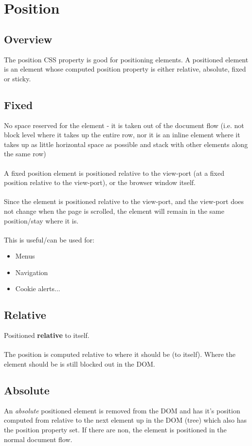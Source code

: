 \documentclass[]{article}
\newcommand{\<}{\guilsinglleft}
\renewcommand{\>}{\guilsinglright}
\renewcommand{\it}[1]{\textit{#1}}
\renewcommand{\bf}[1]{\textbf{#1}}
\begin{document}
\section{Position}
\subsection{Overview}
The position CSS property is good for positioning elements. A positioned element is an element whose computed position property is either relative, absolute, fixed or sticky. 

\subsection{Fixed}
No space reserved for the element - it is taken out of the  document flow (i.e. not block level where it takes up the entire row, nor it is an inline element where it takes up as little horizontal space as possible and stack with other elements along the same row)
\\\\
A fixed position element is positioned relative to the view-port (at a fixed position relative to the view-port), or the browser window itself. 
\\\\
Since the element is positioned relative to the view-port, and the view-port does not change when the page is scrolled, the element will remain in the same position/stay where it is.
\\\\
This is useful/can be used for:
\begin{itemize}
	\item Menus
	\item Navigation
	\item Cookie alerts...
\end{itemize}

\subsection{Relative}
Positioned \bf{relative} to itself.
\\\\
The position is computed relative to where it should be (to itself).  Where the element should be is still blocked out in the DOM.

\subsection{Absolute}
An \it{absolute} positioned element is removed from the DOM and has it's position computed from relative to the next element up in the DOM (tree) which also has the position property set.  If there are non, the element is positioned in the normal document flow.
\end{document}
